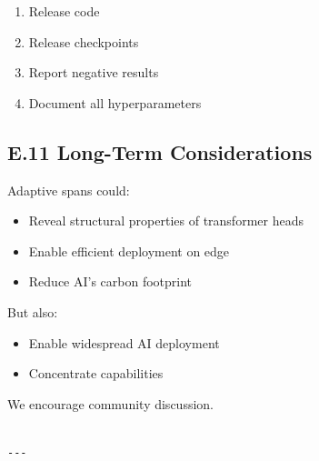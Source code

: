 \begin{enumerate}
\item Release code
\item Release checkpoints
\item Report negative results
\item Document all hyperparameters

\end{enumerate}
\subsection{E.11 Long-Term Considerations}

Adaptive spans could:

\begin{itemize}
\item Reveal structural properties of transformer heads
\item Enable efficient deployment on edge
\item Reduce AI's carbon footprint

\end{itemize}
But also:

\begin{itemize}
\item Enable widespread AI deployment
\item Concentrate capabilities

\end{itemize}
We encourage community discussion.
\begin{lstlisting}

---
\end{lstlisting}